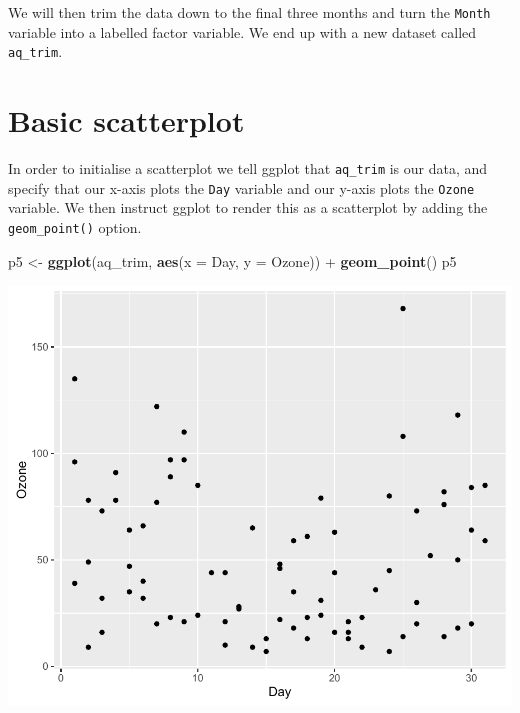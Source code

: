 \documentclass[]{article}
\newenvironment{Shaded}{\begin{snugshade}}{\end{snugshade}}
\newcommand{\KeywordTok}[1]{\textcolor[rgb]{0.13,0.29,0.53}{\textbf{{#1}}}}
\newcommand{\DataTypeTok}[1]{\textcolor[rgb]{0.13,0.29,0.53}{{#1}}}
\newcommand{\DecValTok}[1]{\textcolor[rgb]{0.00,0.00,0.81}{{#1}}}
\newcommand{\StringTok}[1]{\textcolor[rgb]{0.31,0.60,0.02}{{#1}}}
\newcommand{\NormalTok}[1]{{#1}}
\begin{document}
We will then trim the data down to the final three months and turn the
\texttt{Month} variable into a labelled factor variable. We end up with
a new dataset called \texttt{aq\_trim}.

\begin{Shaded}
\end{Shaded}

\section{Basic scatterplot}\label{basic-scatterplot}

In order to initialise a scatterplot we tell ggplot that
\texttt{aq\_trim} is our data, and specify that our x-axis plots the
\texttt{Day} variable and our y-axis plots the \texttt{Ozone} variable.
We then instruct ggplot to render this as a scatterplot by adding the
\texttt{geom\_point()} option.

\begin{Shaded}
\begin{Highlighting}[]
\NormalTok{p5 <-}\StringTok{ }\KeywordTok{ggplot}\NormalTok{(aq_trim, }\KeywordTok{aes}\NormalTok{(}\DataTypeTok{x =} \NormalTok{Day, }\DataTypeTok{y =} \NormalTok{Ozone)) +}\StringTok{ }
\StringTok{  }\KeywordTok{geom_point}\NormalTok{()}
\NormalTok{p5}
\end{Highlighting}
\end{Shaded}

\begin{center}\includegraphics{5_Scatter_Plots_pdf/scatter_1-1} \end{center}
\end{document}
